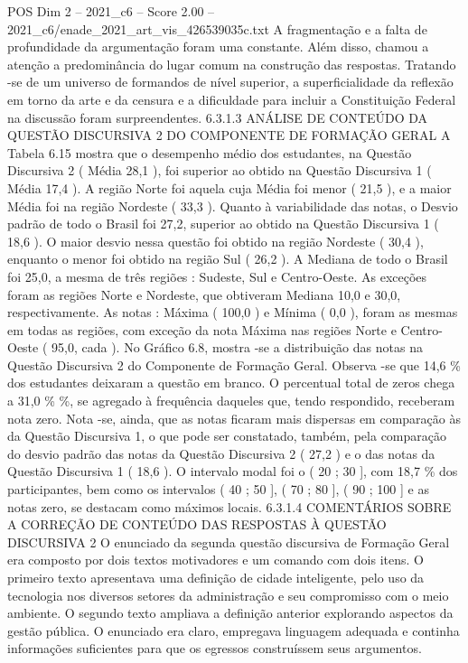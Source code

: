 \begin{textsample}{POS Dim 2 – 2021\_c6 – Score 2.00 – 2021\_c6/enade\_2021\_art\_vis\_426539035c.txt}
A fragmentação e a falta de profundidade da argumentação foram uma constante.
Além disso, chamou a atenção a predominância do lugar comum na construção das respostas.
Tratando -se de um universo de formandos de nível superior, a superficialidade da reflexão em torno da arte e da censura e a dificuldade para incluir a Constituição Federal na discussão foram surpreendentes. 6.3.1.3 ANÁLISE DE CONTEÚDO DA QUESTÃO DISCURSIVA 2 DO COMPONENTE DE FORMAÇÃO GERAL A Tabela 6.15 mostra que o desempenho médio dos estudantes, na Questão Discursiva 2 ( Média 28,1 ), foi superior ao obtido na Questão Discursiva 1 ( Média 17,4 ).
A região Norte foi aquela cuja Média foi menor ( 21,5 ), e a maior Média foi na região Nordeste ( 33,3 ).
Quanto à variabilidade das notas, o Desvio padrão de todo o Brasil foi 27,2, superior ao obtido na Questão Discursiva 1 ( 18,6 ).
O maior desvio nessa questão foi obtido na região Nordeste ( 30,4 ), enquanto o menor foi obtido na região Sul ( 26,2 ).
A Mediana de todo o Brasil foi 25,0, a mesma de três regiões : Sudeste, Sul e Centro-Oeste.
As exceções foram as regiões Norte e Nordeste, que obtiveram Mediana 10,0 e 30,0, respectivamente.
As notas : Máxima ( 100,0 ) e Mínima ( 0,0 ), foram as mesmas em todas as regiões, com exceção da nota Máxima nas regiões Norte e Centro-Oeste ( 95,0, cada ).
No Gráfico 6.8, mostra -se a distribuição das notas na Questão Discursiva 2 do Componente de Formação Geral.
Observa -se que 14,6 \% dos estudantes deixaram a questão em branco.
O percentual total de zeros chega a 31,0 \% \%, se agregado à frequência daqueles que, tendo respondido, receberam nota zero.
Nota -se, ainda, que as notas ficaram mais dispersas em comparação às da Questão Discursiva 1, o que pode ser constatado, também, pela comparação do desvio padrão das notas da Questão Discursiva 2 ( 27,2 ) e o das notas da Questão Discursiva 1 ( 18,6 ).
O intervalo modal foi o ( 20 ; 30 ], com 18,7 \% dos participantes, bem como os intervalos ( 40 ; 50 ], ( 70 ; 80 ], ( 90 ; 100 ] e as notas zero, se destacam como máximos locais. 6.3.1.4 COMENTÁRIOS SOBRE A CORREÇÃO DE CONTEÚDO DAS RESPOSTAS À QUESTÃO DISCURSIVA 2 O enunciado da segunda questão discursiva de Formação Geral era composto por dois textos motivadores e um comando com dois itens.
O primeiro texto apresentava uma definição de cidade inteligente, pelo uso da tecnologia nos diversos setores da administração e seu compromisso com o meio ambiente.
O segundo texto ampliava a definição anterior explorando aspectos da gestão pública.
O enunciado era claro, empregava linguagem adequada e continha informações suficientes para que os egressos construíssem seus argumentos.

\end{textsample}
